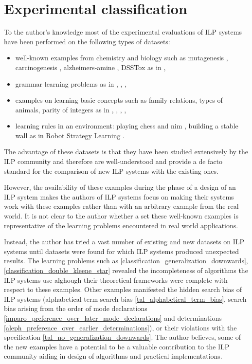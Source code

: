 \section{Experimental classification}\label{evaluation_experimental_classification}
To the author's knowledge most of the experimental evaluations of ILP systems have been performed on the following types of datasets:
\begin{itemize}
\item well-known examples from chemistry and biology such as mutagenesis \cite{srinivasan1994mutagenesis}, carcinogenesis \cite{srinivasan1997carcinogenesis}, alzheimers-amine \cite{king1995relating}, DSSTox \cite{richard2002distributed} as in \cite{muggleton2008toplog}\cite{corapi2011nonmonotonic},
\item grammar learning problems as in \cite{muggleton1999progolWebsite} \cite{muggleton2012mc}, \cite{muggleton2013meta}, \cite{kimber2012learning},
\item examples on learning basic concepts such as family relations, types of animals, parity of integers as in \cite{muggleton1999progolWebsite}, \cite{santos2008toplogWebsite}, \cite{corapi2011tal}, \cite{aleph2007},
\item learning rules in an environment: playing chess and nim \cite{muggleton1999progolWebsite}, building a stable wall as in Robot Strategy Learning \cite{muggleton2014meta}.
\end{itemize}

The advantage of these datasets is that they have been studied extensively by the ILP community and therefore are well-understood and provide a de facto standard for the comparison of new ILP systems with the existing ones.

However, the availability of these examples during the phase of a design of an ILP system makes the authors of ILP systems focus on making their systems work with these examples rather than with an arbitrary example from the real world. It is not clear to the author whether a set these well-known examples is representative of the learning problems encountered in real world applications.

Instead, the author has tried a vast number of existing and new datasets on ILP systems until datasets were found for which ILP systems produced unexpected results. The learning problems such as \ref{classification_generalization_downwards}, \ref{classification_double_kleene_star} revealed the incompleteness of algorithms the ILP systems use alghough their theoretical frameworks were complete with respect to these examples. Other examples manifested the hidden search bias of ILP systems (alphabetical term search bias \ref{tal_alphabetical_term_bias}, search bias arising from the order of mode declarations \ref{imparo_preference_over_later_mode_declarations} and determinations \ref{aleph_preference_over_earlier_determinations}), or their violations with the specification \ref{tal_no_generalization_downwards}. The author believes, some of the new examples have a potential to be a valuable contribution to the ILP community aiding in design of algorithms and practical implementations.

